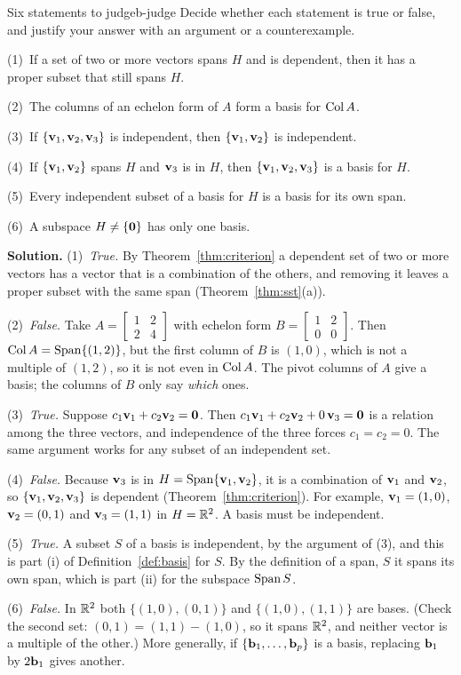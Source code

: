 \documentclass[11pt]{article}
\begin{document}
\begin{exmp}{Six statements to judge}{b-judge}
Decide whether each statement is true or false, and justify your answer with an argument or a counterexample.

(1)~If a set of two or more vectors spans $H$ and is dependent, then it has a proper subset that still spans $H$.

(2)~The columns of an echelon form of $A$ form a basis for $\operatorname{Col} A$.

(3)~If $\{\mathbf{v}_1,\mathbf{v}_2,\mathbf{v}_3\}$ is independent, then $\{\mathbf{v}_1,\mathbf{v}_2\}$ is independent.

(4)~If $\{\mathbf{v}_1,\mathbf{v}_2\}$ spans $H$ and $\mathbf{v}_3$ is in $H$, then $\{\mathbf{v}_1,\mathbf{v}_2,\mathbf{v}_3\}$ is a basis for $H$.

(5)~Every independent subset of a basis for $H$ is a basis for its own span.

(6)~A subspace $H\neq\{\mathbf{0}\}$ has only one basis.

\textbf{Solution.} (1)~\emph{True.} By Theorem~\ref{thm:criterion} a dependent set of two or more vectors has a vector that is a combination of the others, and removing it leaves a proper subset with the same span (Theorem~\ref{thm:sst}(a)).

(2)~\emph{False.} Take $A=\begin{bmatrix}1&2\\2&4\end{bmatrix}$ with echelon form $B=\begin{bmatrix}1&2\\0&0\end{bmatrix}$. Then $\operatorname{Col} A=\operatorname{Span}\{(1,2)\}$, but the first column of $B$ is $(1,0)$, which is not a multiple of $(1,2)$, so it is not even in $\operatorname{Col} A$. The pivot columns of $A$ give a basis; the columns of $B$ only say \emph{which} ones.

(3)~\emph{True.} Suppose $c_1\mathbf{v}_1+c_2\mathbf{v}_2=\mathbf{0}$. Then $c_1\mathbf{v}_1+c_2\mathbf{v}_2+0\,\mathbf{v}_3=\mathbf{0}$ is a relation among the three vectors, and independence of the three forces $c_1=c_2=0$. The same argument works for any subset of an independent set.

(4)~\emph{False.} Because $\mathbf{v}_3$ is in $H=\operatorname{Span}\{\mathbf{v}_1,\mathbf{v}_2\}$, it is a combination of $\mathbf{v}_1$ and $\mathbf{v}_2$, so $\{\mathbf{v}_1,\mathbf{v}_2,\mathbf{v}_3\}$ is dependent (Theorem~\ref{thm:criterion}). For example, $\mathbf{v}_1=(1,0)$, $\mathbf{v}_2=(0,1)$ and $\mathbf{v}_3=(1,1)$ in $H=\mathbb{R}^2$. A basis must be independent.

(5)~\emph{True.} A subset $S$ of a basis is independent, by the argument of (3), and this is part (i) of Definition~\ref{def:basis} for $S$. By the definition of a span, $S$ it spans its own span, which is part (ii) for the subspace $\operatorname{Span} S$.

(6)~\emph{False.} In $\mathbb{R}^2$ both $\{(1,0),(0,1)\}$ and $\{(1,0),(1,1)\}$ are bases. (Check the second set: $(0,1)=(1,1)-(1,0)$, so it spans $\mathbb{R}^2$, and neither vector is a multiple of the other.) More generally, if $\{\mathbf{b}_1,\dots,\mathbf{b}_p\}$ is a basis, replacing $\mathbf{b}_1$ by $2\mathbf{b}_1$ gives another.
\end{exmp}
\end{document}
